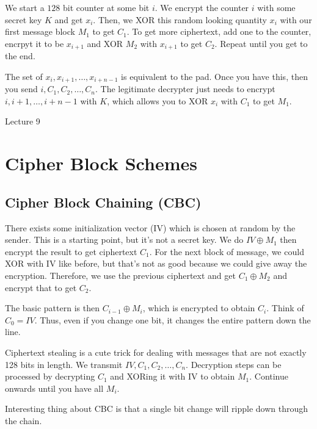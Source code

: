 \documentclass[psamsfonts]{amsart}
\begin{document}
We start a $128$ bit counter at some bit $i$. We encrypt the counter $i$ with some secret key $K$ and get $x_i$. Then, we XOR this random looking quantity $x_i$ with our first message block $M_1$ to get $C_1$. To get more ciphertext, add one to the counter, encrpyt it to be $x_{i+1}$ and XOR $M_2$ with $x_{i+1}$ to get $C_2$. Repeat until you get to the end.

The set of $x_{i}, x_{i+1}, \ldots, x_{i+n-1}$ is equivalent to the pad. Once you have this, then you send $i, C_1, C_2, \ldots, C_n$. The legitimate decrypter just needs to encrypt $i, i+1, \ldots, i+n-1$ with $K$, which allows you to XOR $x_{i}$ with $C_1$ to get $M_1$.


\newpage
\Large{Lecture 9}


\maketitle

\section{Cipher Block Schemes}

\subsection{Cipher Block Chaining (CBC)}

There exists some initialization vector (IV) which is chosen at random by the sender. This is a starting point, but it's not a secret key. We do $IV \oplus M_1$ then encrypt the result to get ciphertext $C_1$. For the next block of message, we could XOR with IV like before, but that's not as good because we could give away the encryption. Therefore, we use the previous ciphertext and get $C_1 \oplus M_2$ and encrypt that to get $C_2$.

The basic pattern is then $C_{i-1} \oplus M_i$, which is encrypted to obtain $C_i$. Think of $C_{0} = IV$. Thus, even if you change one bit, it changes the entire pattern down the line.

Ciphertext stealing is a cute trick for dealing with messages that are not exactly 128 bits in length. We transmit $IV, C_1, C_2, \ldots, C_n$. Decryption steps can be processed by decrypting $C_1$ and XORing it with IV to obtain $M_1$. Continue onwards until you have all $M_{i}$.

Interesting thing about CBC is that a single bit change will ripple down through the chain.
\end{document}
